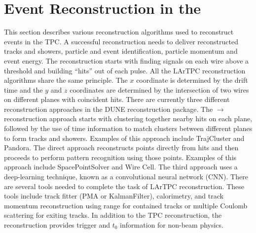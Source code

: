\section{Event Reconstruction in the }
\label{sec:tools-fdreco}

This section describes various reconstruction algorithms used to reconstruct events in the  TPC. A successful \lartpc reconstruction needs to deliver reconstructed tracks and showers, particle and event identification, particle momentum and event energy. The reconstruction starts with finding signals on each wire above a threshold and building ``hits'' out of each pulse. All the LArTPC \threed reconstruction algorithms share the same principle. The $x$ coordinate is determined by the drift time and the $y$ and $z$ coordinates are determined by the intersection of two wires on different planes with coincident hits. There are currently three different reconstruction approaches in the DUNE reconstruction package. The \twod$\rightarrow$\threed reconstruction approach starts with clustering together nearby hits on each plane, %
followed by the use of time information to match \twod clusters between different planes to form \threed tracks and showers. Examples of this approach include TrajCluster and Pandora.  The direct \threed approach reconstructs \threed points directly from hits and then proceeds to perform pattern recognition using those \threed points. Examples of this approach include SpacePointSolver and Wire Cell. The third approach uses a deep-learning technique, known as a convolutional neural network (CNN). There are several tools needed to complete the task of LArTPC reconstruction. These tools include track fitter (PMA or KalmanFilter), calorimetry,  and track momentum reconstruction using range for contained tracks or multiple Coulomb scattering for exiting tracks. In addition to the TPC reconstruction, the  reconstruction provides trigger and $t_0$ information for non-beam physics. 

